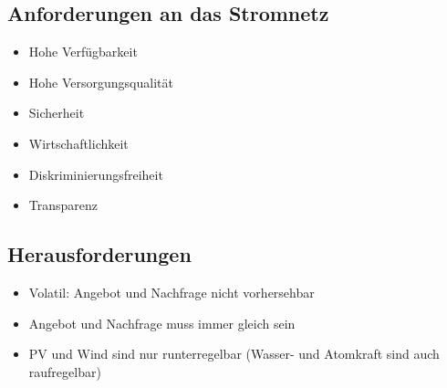 
\subsection{Anforderungen an das Stromnetz}
    \begin{minipage}[t]{0.49\columnwidth}
        \begin{itemize}
            \item Hohe Verfügbarkeit
            \item Hohe Versorgungsqualität
            \item Sicherheit
        \end{itemize}
    \end{minipage}
    \hfill
    \begin{minipage}[t]{0.49\columnwidth}
        \begin{itemize}
            \item Wirtschaftlichkeit
            \item Diskriminierungsfreiheit
            \item Transparenz
        \end{itemize}
    \end{minipage}


\subsection{Herausforderungen}
    \begin{itemize}
        \item Volatil: Angebot und Nachfrage nicht vorhersehbar
        \item Angebot und Nachfrage muss immer gleich sein
        \item PV und Wind sind nur runterregelbar (Wasser- und Atomkraft sind auch raufregelbar)
    \end{itemize}

